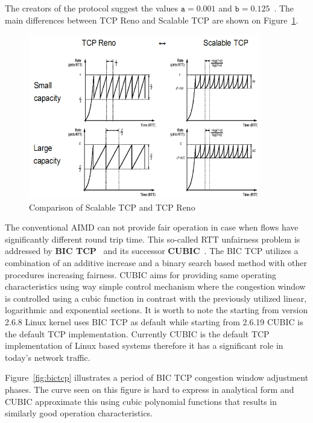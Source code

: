\documentclass[a4paper]{article}
\begin{document}
The creators of the protocol suggest the values $\texttt{a}=0.001$ and $\texttt{b}=0.125$~\cite{ScalableTCP}. The main
differences between TCP Reno and Scalable TCP are shown on Figure~\ref{fig:ScalableVSReno}.

\begin{figure}[H]
    \centering
    \includegraphics[width=0.9\textwidth]{figures/ScalableTCP.png}
    \caption{Comparison of Scalable TCP and TCP Reno}
    \label{fig:ScalableVSReno}
\end{figure}

The conventional AIMD can not provide fair operation in case when flows have significantly different round trip time.
This so-called RTT unfairness problem is addressed by \textbf{BIC TCP}~\cite{BICTCP} and its successor
\textbf{CUBIC}~\cite{CUBIC}. The BIC TCP utilizes a combination of an additive increase and a binary search based
method with other procedures increasing fairness. CUBIC aims for providing same operating characteristics using way
simple control mechanism where the congestion window is controlled using a cubic function in contrast with the
previously utilized linear, logarithmic and exponential sections. It is worth to note the starting from version 2.6.8
Linux kernel uses BIC TCP as default while starting from 2.6.19 CUBIC is the default TCP implementation. Currently
CUBIC is the default TCP implementation of Linux based systems therefore it has a significant role in today's network
traffic.

Figure~\ref{fig:bictcp} illustrates a period of BIC TCP congestion window adjustment phases. The curve seen on this
figure is hard to express in analytical form and CUBIC approximate this using cubic polynomial functions that results
in similarly good operation characteristics.
\end{document}
